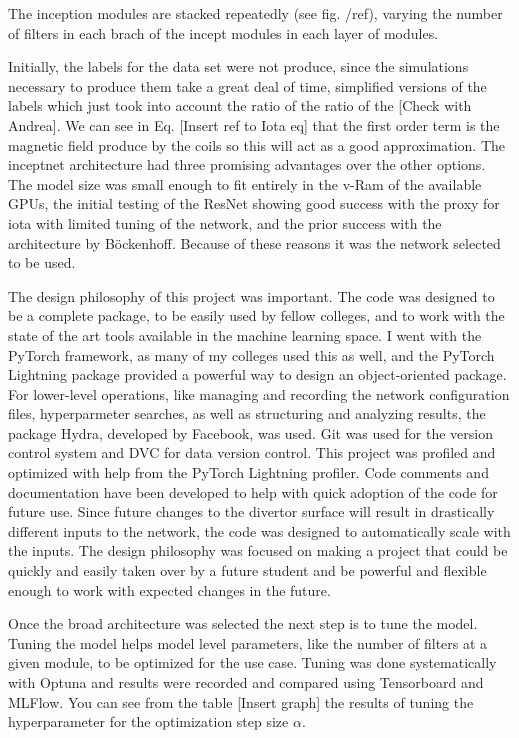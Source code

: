 The inception modules are stacked repeatedly (see fig. /ref{}), varying the number of filters in each brach of the incept modules in each layer of modules.




Initially, the labels for the data set were not produce, since the simulations necessary to produce them take a great deal of time, simplified versions of the labels which just took into account the ratio of the ratio of the [Check with Andrea].
We can see in Eq. [Insert ref to Iota eq] that the first order term is the magnetic field produce by the coils so this will act as a good approximation.
The inceptnet architecture had three promising advantages over the other options.
The model size was small enough to fit entirely in the v-Ram of the available GPUs, the initial testing of the ResNet showing good success with the proxy for iota with limited tuning of the network, and the prior success with the architecture by Böckenhoff.
Because of these reasons it was the network selected to be used.


\label{sec:code:philosophy}
The design philosophy of this project was important. The code was designed to be a complete package, to be easily used by fellow colleges, and to work with the state of the art tools available in the machine learning space.
I went with the PyTorch framework, as many of my colleges used this as well, and the PyTorch Lightning package provided a powerful way to design an object-oriented package.
For lower-level operations, like managing and recording the network configuration files, hyperparmeter searches, as well as structuring and analyzing results, the package Hydra, developed by Facebook, was used.
Git was used for the version control system and DVC for data version control.
This project was profiled and optimized with help from the PyTorch Lightning profiler.
Code comments and documentation have been developed to help with quick adoption of the code for future use.
Since future changes to the divertor surface will result in drastically different inputs to the network, the code was designed to automatically scale with the inputs.
The design philosophy was focused on making a project that could be quickly and easily taken over by a future student and be powerful and flexible enough to work with expected changes in the future.



\label{sec:code:hyperparameters}

Once the broad architecture was selected the next step is to tune the model.
Tuning the model helps model level parameters, like the number of filters at a given module, to be optimized for the use case.
Tuning was done systematically with Optuna and results were recorded and compared using Tensorboard and MLFlow.
You can see from the table [Insert graph] the results of tuning the hyperparameter for the optimization step size $\alpha$.




